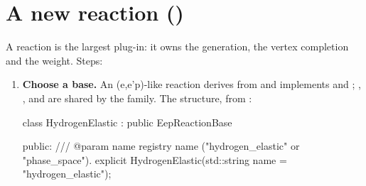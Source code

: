 \section{\texorpdfstring{A new reaction ()}{A new reaction (IReaction)}}\label{developer_manual-04u5fextending:45-a-new-reaction-ireaction}
A reaction is the largest plug-in: it owns the generation, the vertex completion and the weight. Steps:

\begin{enumerate}
\item \textbf{Choose a base.} An (e,\allowbreak{}e'p)-like reaction derives from  and implements  and
; , ,  and  are shared by the family.
The structure, from :

\begin{simccode}[basicstyle=\ttfamily\footnotesize,style=simccpp]
class HydrogenElastic : public EepReactionBase {
public:
    /// @param name registry name ("hydrogen_elastic" or "phase_space").
    explicit HydrogenElastic(std::string name = "hydrogen_elastic");

}
\end{simccode}
\end{enumerate}
